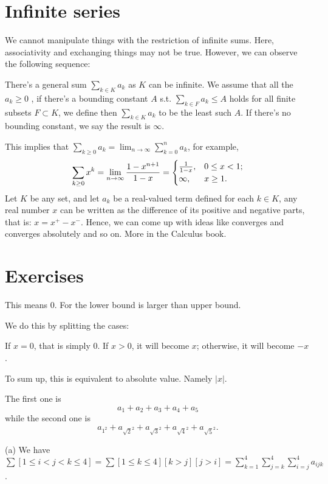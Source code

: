 \section{Infinite series} 

We cannot manipulate things with the restriction of infinite sums. 
Here, associativity and exchanging things may not be true. However, we 
can observe the following sequence: 

There's a general sum $\sum_{k \in K}^{}a_k$ as $K$ can be infinite. 
We assume that all the $a_k\geq 0$
, if there's a bounding constant $A$ s.t. $\sum_{k\in F}a_k\leq A$ holds
for all finite subsets $F \subset K$, we define then $\sum_{k\in K}a_k$
to be the least such $A$. If there's no bounding constant, we say 
the result is $\infty$.

This implies that $\sum_{k\geq 0}a_k=\lim_{n\to \infty} \sum_{k=0}^{n}a_k$,
for example, 
\[
    \sum_{k\geq 0}^{}x^k = \lim_{n \to \infty} {1-x^{n+1}\over 1-x}
    =
    \begin{cases}
        {1\over 1-x}, & 0\leq x< 1;\\
        \infty, &x\geq 1.
    \end{cases}
\]
Let $K$ be any set, and let $a_k$ be a real-valued term defined for each 
$k\in K$, any real number $x$ can be written as the difference of its 
positive and negative parts, that is: $x=x^+-x^-$. Hence, we can come up 
with ideas like converges and converges absolutely and so on. More in the 
Calculus book. 

\section{Exercises}

 This means $0$. For the lower bound is larger than upper bound.

 We do this by splitting the cases: 

If $x=0$, that is simply 0. If $x>0$, it will become $x$; otherwise, it 
will become $-x$. 

To sum up, this is equivalent to absolute value. Namely $|x|$. 

 The first one is 
\[
    a_1 + a_2+a_3+a_4+a_5
\]
while the second one is
\[
    a_{1^2}+a_{\sqrt{2}^2}+a_{\sqrt{3}^2}+a_{\sqrt{4}^2}+a_{\sqrt{5}^2}. 
\]

 (a) We have $\sum[1\leq i<j<k\leq 4]=\sum[1\leq k\leq 4][k>j][j>i]=\sum_{k=1}^{4}\sum_{j=k}^{4}\sum_{i=j}^{4} a_{ijk}$. 

